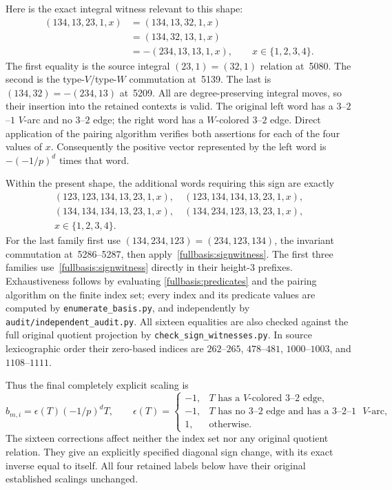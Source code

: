 Here is the exact integral witness relevant to this shape:
\begin{equation}\label{fullbasis:signwitness}
 \begin{aligned}
 (134,13,23,1,x)
 &=(134,13,32,1,x)\\
 &=(134,32,13,1,x)\\
 &=-(234,13,13,1,x),\qquad x\in\{1,2,3,4\}.
 \end{aligned}
\end{equation}
The first equality is the source integral $(23,1)=(32,1)$ relation
at~5080.  The second is the type-$V$/type-$W$ commutation at~5139.
The last is $(134,32)=-(234,13)$ at~5209.  All are degree-preserving
integral moves, so their insertion into the retained contexts is valid.
The original left word has a $3$--$2$--$1$ $V$-arc and no $3$--$2$
edge; the right word has a $W$-colored $3$--$2$ edge.  Direct application
of the pairing algorithm verifies both assertions for each of the four
values of $x$.  Consequently the positive vector represented by the
left word is $-(-1/p)^d$ times that word.

Within the present shape, the additional words requiring this sign are
exactly
\[
\begin{gathered}
 (123,123,134,13,23,1,x),\quad
 (123,134,134,13,23,1,x),\\
 (134,134,134,13,23,1,x),\quad
 (134,234,123,13,23,1,x),\\
 x\in\{1,2,3,4\}.
\end{gathered}
\]
For the last family first use
$(134,234,123)=(234,123,134)$, the invariant commutation
at~5286--5287, then apply~\eqref{fullbasis:signwitness}.  The first
three families use~\eqref{fullbasis:signwitness} directly in their
height-$3$ prefixes.  Exhaustiveness follows by evaluating
\eqref{fullbasis:predicates} and the pairing algorithm on the finite
index set; every index and its predicate values are computed by
\texttt{enumerate\_basis.py}, and independently by
\texttt{audit/independent\_audit.py}.  All sixteen equalities are also
checked against the full original quotient projection by
\texttt{check\_sign\_witnesses.py}.  In source lexicographic order their
zero-based indices are $262$--$265$, $478$--$481$, $1000$--$1003$, and
$1108$--$1111$.

Thus the final completely explicit scaling is
\begin{equation}\label{fullbasis:sign}
 b_{m,i}=\epsilon(T)(-1/p)^d T,
 \qquad
 \epsilon(T)=
 \begin{cases}
 -1,&\text{$T$ has a $V$-colored $3$--$2$ edge},\\
 -1,&\text{$T$ has no $3$--$2$ edge and has a $3$--$2$--$1$ $V$-arc},\\
 1,&\text{otherwise}.
 \end{cases}
\end{equation}
The sixteen corrections affect neither the index set nor any original
quotient relation.  They give an explicitly specified diagonal sign
change, with its exact inverse equal to itself.  All four retained
labels below have their original established scalings unchanged.

